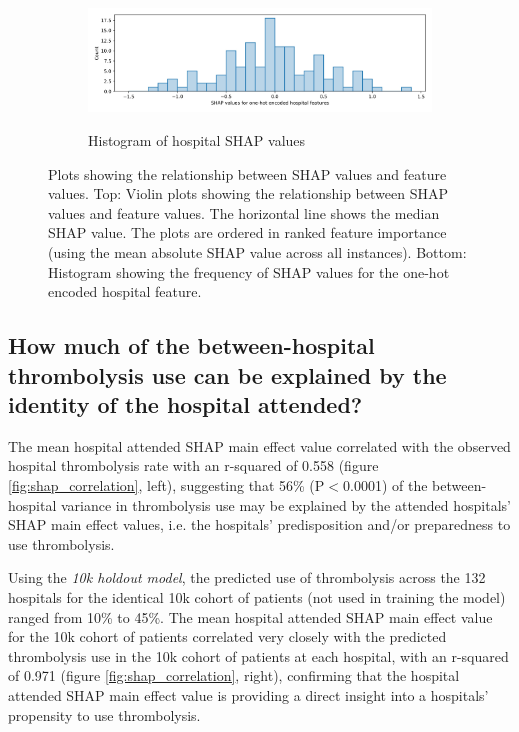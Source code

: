 \begin{figure}
\begin{subfigure}{.9\textwidth}
  \label{fig:shap_feature_subfigure_a}
\end{subfigure}
\begin{subfigure}{.9\textwidth}
  \centering
  \caption*{\footnotesize{\textsf{Histogram of hospital SHAP values}}}
    \includegraphics[width=1.\textwidth]{./images/03a_xgb_10_features_hosp_shap_hist}
  \label{fig:shap_feature_subfigure_b}
\end{subfigure}
\caption{Plots showing the relationship between SHAP values and feature values. Top: Violin plots showing the relationship between SHAP values and feature values. The horizontal line shows the median SHAP value. The plots are ordered in ranked feature importance (using the mean absolute SHAP value across all instances). Bottom: Histogram showing the frequency of SHAP values for the one-hot encoded hospital feature.}
\label{fig:shap_feature_subfigure}
\end{figure}


\subsection{How much of the between-hospital thrombolysis use can be explained by the identity of the hospital attended?}

The mean hospital attended SHAP main effect value correlated with the observed hospital thrombolysis rate with an r-squared of 0.558 (figure \ref{fig:shap_correlation}, left), suggesting that 56\% (P$<$0.0001) of the between-hospital variance in thrombolysis use may be explained by the attended hospitals' SHAP main effect values, i.e. the hospitals' predisposition and/or preparedness to use thrombolysis.

Using the \emph{10k holdout model}, the predicted use of thrombolysis across the 132 hospitals for the identical 10k cohort of patients (not used in training the model) ranged from 10\% to 45\%. The mean hospital attended SHAP main effect value for the 10k cohort of patients correlated very closely with the predicted thrombolysis use in the 10k cohort of patients at each hospital, with an r-squared of 0.971 (figure \ref{fig:shap_correlation}, right), confirming that the hospital attended SHAP main effect value is providing a direct insight into a hospitals' propensity to use thrombolysis.

